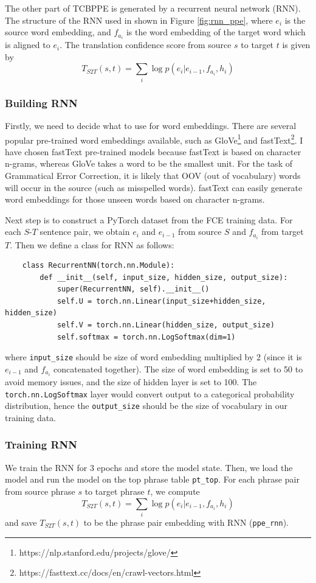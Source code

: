 \documentclass[12pt,a4paper,twoside,openright]{report}
\begin{document}
The other part of TCBPPE is generated by a recurrent neural network (RNN). The structure of the RNN used in shown in Figure \ref{fig:rnn_ppe}, where $e_i$ is the source word embedding, and $f_{a_i}$ is the word embedding of the target word which is aligned to $e_i$. The translation confidence score from source $s$ to target $t$ is given by
\[ T_{S2T}(s, t) = \sum_{i} \log p(e_i|e_{i-1}, f_{a_i}, h_i)\]

\subsubsection{Building RNN}
Firstly, we need to decide what to use for word embeddings. There are several popular pre-trained word embeddings available, such as GloVe\footnote{https://nlp.stanford.edu/projects/glove/} and fastText\footnote{https://fasttext.cc/docs/en/crawl-vectors.html}. I have chosen fastText pre-trained models because fastText is based on character n-grams, whereas GloVe takes a word to be the smallest unit. For the task of Grammatical Error Correction, it is likely that OOV (out of vocabulary) words will occur in the source (such as misspelled words). fastText can easily generate word embeddings for those unseen words based on character n-grams.

Next step is to construct a PyTorch dataset from the FCE training data. For each $S\textrm{-}T$ sentence pair, we obtain $e_i$ and $e_{i-1}$ from source $S$ and $f_{a_i}$ from target $T$. Then we define a class for RNN as follows:

\begin{verbatim}
    class RecurrentNN(torch.nn.Module):
        def __init__(self, input_size, hidden_size, output_size):
            super(RecurrentNN, self).__init__()
            self.U = torch.nn.Linear(input_size+hidden_size, hidden_size)
            self.V = torch.nn.Linear(hidden_size, output_size)
            self.softmax = torch.nn.LogSoftmax(dim=1)
\end{verbatim}

where \texttt{input\_size} should be size of word embedding multiplied by 2 (since it is $e_{i-1}$ and $f_{a_i}$ concatenated together). The size of word embedding is set to 50 to avoid memory issues, and the size of hidden layer is set to 100. The \texttt{torch.nn.LogSoftmax} layer would convert output to a categorical probability distribution, hence the \texttt{output\_size} should be the size of vocabulary in our training data.

\subsubsection{Training RNN}
We train the RNN for 3 epochs and store the model state. Then, we load the model and run the model on the top phrase table \texttt{pt\_top}. For each phrase pair from source phrase $s$ to target phrase $t$, we compute 
\[ T_{S2T}(s, t) = \sum_{i} \log p(e_i|e_{i-1}, f_{a_i}, h_i)\]
and save $T_{S2T}(s, t)$ to be the phrase pair embedding with RNN (\texttt{ppe\_rnn}). 
\end{document}
